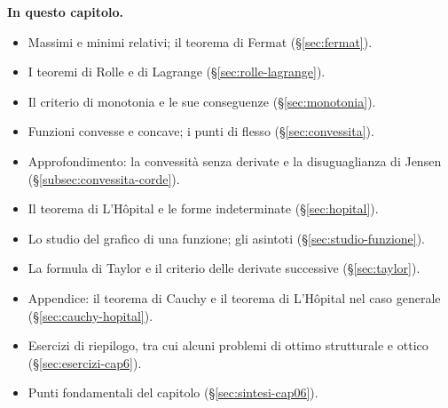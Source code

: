 \medskip
\noindent\textbf{In questo capitolo.}
\begin{itemize}
  \item Massimi e minimi relativi; il teorema di Fermat (\S\ref{sec:fermat}).
  \item I teoremi di Rolle e di Lagrange (\S\ref{sec:rolle-lagrange}).
  \item Il criterio di monotonia e le sue conseguenze (\S\ref{sec:monotonia}).
  \item Funzioni convesse e concave; i punti di flesso (\S\ref{sec:convessita}).
  \item Approfondimento: la convessità senza derivate e la disuguaglianza di Jensen
  (\S\ref{subsec:convessita-corde}).
  \item Il teorema di L'Hôpital e le forme indeterminate (\S\ref{sec:hopital}).
  \item Lo studio del grafico di una funzione; gli asintoti (\S\ref{sec:studio-funzione}).
  \item La formula di Taylor e il criterio delle derivate successive (\S\ref{sec:taylor}).
  \item Appendice: il teorema di Cauchy e il teorema di L'Hôpital nel caso generale
  (\S\ref{sec:cauchy-hopital}).
  \item Esercizi di riepilogo, tra cui alcuni problemi di ottimo strutturale e ottico
  (\S\ref{sec:esercizi-cap6}).
  \item Punti fondamentali del capitolo (\S\ref{sec:sintesi-cap06}).
\end{itemize}











